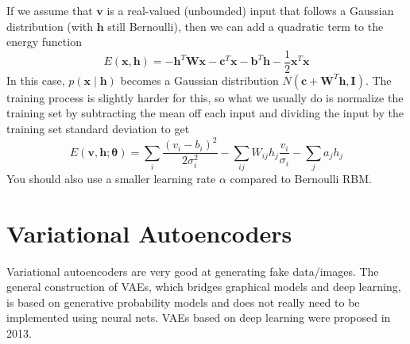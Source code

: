 \documentclass{article}
\begin{document}
      \begin{definition} 
        If we assume that $\mathbf{v}$ is a real-valued (unbounded) input that follows a Gaussian distribution (with $\mathbf{h}$ still Bernoulli), then we can add a quadratic term to the energy function 
        \begin{equation} 
          E(\mathbf{x}, \mathbf{h}) = - \mathbf{h}^T \mathbf{W} \mathbf{x} - \mathbf{c}^T \mathbf{x} - \mathbf{b}^T \mathbf{h} - \frac{1}{2} \mathbf{x}^T \mathbf{x}
        \end{equation}
        In this case, $p(\mathbf{x} \mid \mathbf{h})$ becomes a Gaussian distribution $N(\mathbf{c} + \mathbf{W}^T \mathbf{h}, \mathbf{I})$. The training process is slightly harder for this, so what we usually do is normalize the training set by subtracting the mean off each input and dividing the input by the training set standard deviation to get  
        \begin{equation} 
          E(\mathbf{v}, \mathbf{h}; \boldsymbol{\theta}) = \sum_i \frac{(v_i - b_i)^2}{2 \sigma_i^2} - \sum_{ij} W_{ij} h_j \frac{v_i}{\sigma_i} - \sum_j a_j h_j
        \end{equation}
        You should also use a smaller learning rate $\alpha$ compared to Bernoulli RBM. 
      \end{definition} 

\section{Variational Autoencoders}

  Variational autoencoders are very good at generating fake data/images. The general construction of VAEs, which bridges graphical models and deep learning, is based on generative probability models and does not really need to be implemented using neural nets. VAEs based on deep learning were proposed in 2013. 
\end{document}
